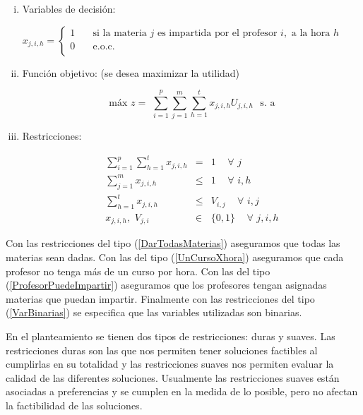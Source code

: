 \begin{enumerate}[i)]
\item Variables de decisión:
  
  $ x_{j,i,h} =
  \begin{cases}
1  & \quad \text{si la materia } j \text{ es impartida por el profesor  } i,\text{ a la hora } h\\
0  & \quad \text{e.o.c. } \\
\end{cases}
$
  
  \item Función objetivo: (se desea maximizar la utilidad)

\begin{equation*}
\text{máx} \,\, z =  \,\, \displaystyle \sum_{i=1}^{p} \sum_{j=1}^{m} \sum_{h=1}^{t} x_{j,i,h} U_{j,i,h} \,\,\,\, \text{s. a}
\end{equation*}

\item Restricciones:
  
  \begin{eqnarray}
\displaystyle \sum_{i=1}^{p} \sum_{h=1}^{t} x_{j,i,h} &=& 1  \,\,\,\,\,\,\, \forall \,\, j\label{DarTodasMaterias}\\
\displaystyle \sum_{j=1}^{m} x_{j,i,h} &\leqslant& 1 \,\,\,\,\,\,\, \forall \,\, i,h \label{UnCursoXhora}\\
\displaystyle \sum_{h=1}^{t} x_{j,i,h} &\leqslant& V_{i,j} \,\,\,\,\,\,\, \forall \,\, i,j \label{ProfesorPuedeImpartir}\\
x_{j,i,h}, \,\, V_{j,i} &\in& \{0,1\} \,\,\,\,\,\,\, \forall \,\, j,i,h \label{VarBinarias}
\end{eqnarray}
\end{enumerate}

Con las restricciones del tipo (\ref{DarTodasMaterias}) aseguramos que todas las materias sean dadas. Con las del tipo (\ref{UnCursoXhora}) aseguramos que cada profesor no tenga más de un curso por hora. Con las del tipo (\ref{ProfesorPuedeImpartir}) aseguramos que los profesores tengan asignadas materias que puedan impartir. Finalmente con las restricciones del tipo (\ref{VarBinarias}) se especifica que las variables utilizadas son binarias.

En el planteamiento se tienen dos tipos de restricciones: duras y suaves. Las restricciones duras son las que nos permiten tener soluciones factibles al cumplirlas en su totalidad y las restricciones suaves nos permiten evaluar la calidad de las diferentes soluciones. Usualmente las restricciones suaves están asociadas a preferencias y se cumplen en la medida de lo posible, pero no afectan la factibilidad de las soluciones.


